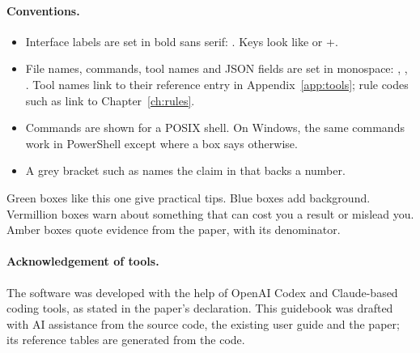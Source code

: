 \paragraph{Conventions.}
\begin{itemize}
  \item Interface labels are set in bold sans serif: . Keys look like  or
        +.
  \item File names, commands, tool names and JSON fields are set in monospace: ,
        , . Tool names link to their reference entry in
        Appendix~\ref{app:tools}; rule codes such as  link to Chapter~\ref{ch:rules}.
  \item Commands are shown for a POSIX shell. On Windows, the same commands work in PowerShell except where a box says
        otherwise.
  \item A grey bracket such as  names the claim in  that backs a number.
\end{itemize}

\begin{tipbox}
Green boxes like this one give practical tips. Blue boxes add background. Vermillion boxes warn about something that
can cost you a result or mislead you. Amber boxes quote evidence from the paper, with its denominator.
\end{tipbox}

\paragraph{Acknowledgement of tools.} The software was developed with the help of OpenAI Codex and Claude-based
coding tools, as stated in the paper's declaration. This guidebook was drafted with AI assistance from the source code, the
existing user guide and the paper; its reference tables are generated from the code.
